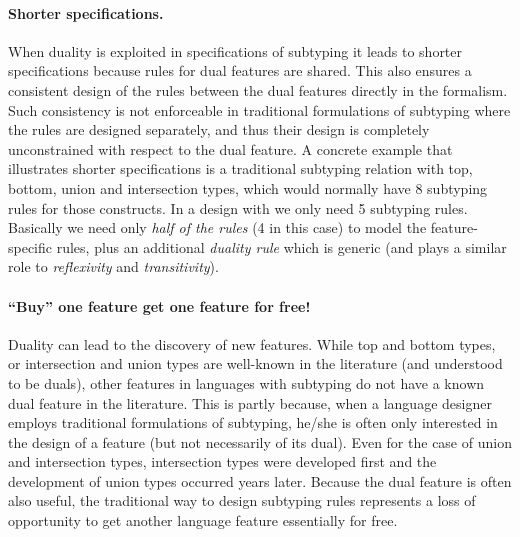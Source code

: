 \paragraph{Shorter specifications.}
When duality is exploited in specifications of subtyping it
leads to shorter specifications because rules for dual features
are shared. This also ensures a consistent design of the rules
between the dual features directly in the formalism. Such consistency is
not enforceable in traditional formulations of subtyping where the
rules are designed separately, and thus their design is completely
unconstrained with respect to the dual feature. A concrete example that illustrates
shorter specifications is a traditional subtyping relation with top, bottom, union and intersection types,
which would normally have 8 subtyping rules for those constructs. In a design with
\nameduo we only need 5 subtyping rules. Basically we need only \emph{half of the rules}
(4 in this case) to model the feature-specific rules, plus an additional
\emph{duality rule} which is generic (and plays a similar role to \emph{reflexivity} and
\emph{transitivity}).

\paragraph{``Buy'' one feature get one feature for free!} Duality can lead to the
discovery of new features. While top and bottom types, or intersection and union
types are well-known in the literature (and understood to be duals),
other features in languages with subtyping do
not have a known dual feature in the literature. This is partly because, 
when a language designer employs traditional formulations of subtyping, he/she
is often only interested in the design of a feature (but not necessarily of its
dual). Even for the case of union and intersection types, intersection types were developed
first and the development of union types occurred years later. 
Because the dual feature is often also useful, the traditional way to design subtyping rules
represents a loss of opportunity to get another language feature essentially for free.

